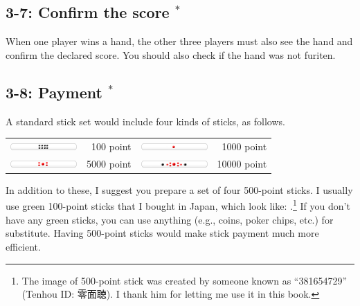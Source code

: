 \subsection*{3-7: Confirm the score $^{*}$}
When one player wins a hand, the other three players must also see the hand and confirm the declared score. You should also check if the hand was not {\jap furiten}.

\subsection*{3-8: Payment $^{*}$}
A standard stick set would include four kinds of sticks, as follows.

\bigskip
\begin{tabular}{l r l r}
\includegraphics[width=1in]{figs/tenbou100} & 100 point &
\includegraphics[width=1in]{figs/tenbou1000} & 1000 point \\
\includegraphics[width=1in]{figs/tenbou5000} & 5000 point &
\includegraphics[width=1in]{figs/tenbou10000} & 10000 point \\
\end{tabular}


\bigskip \noindent
In addition to these, I suggest you prepare a set of four 500-point sticks. I usually use green 100-point sticks that I bought in Japan, which look like: .\footnote{The image of 500-point stick was created by someone known as ``381654729'' ({\jap Tenhou} ID: 零面聴). I thank him for letting me use it in this book.} If you don't have any green sticks, you can use anything (e.g., coins, poker chips, etc.) for substitute.
Having 500-point sticks would make stick payment much more efficient.

